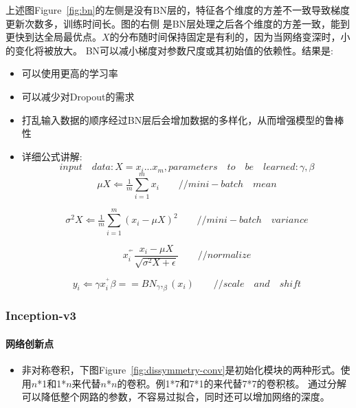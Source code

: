 \documentclass{article}
\begin{document}
\begin{CJK}{UTF8}{gbsn}
上述图Figure~\ref{fig:bn}的左侧是没有BN层的，特征各个维度的方差不一致导致梯度更新次数多，训练时间长。图的右侧
是BN层处理之后各个维度的方差一致，能到更快到达全局最优点。$X$的分布随时间保持固定是有利的，因为当网络变深时，小的变化将被放大。
BN可以减小梯度对参数尺度或其初始值的依赖性。结果是:
\begin{itemize}
\item 可以使用更高的学习率
\item 可以减少对Dropout的需求
\item 打乱输入数据的顺序经过BN层后会增加数据的多样化，从而增强模型的鲁棒性
\item 详细公式讲解:
    \begin{equation}
        input \quad data: X = {x_i...x_m},parameters \quad to \quad be \quad learned: \gamma,\beta 
    \end{equation}
    \begin{equation}
        \mu X \Leftarrow  \tfrac{1}{m} \sum_{i=1}^m x_i  \qquad  //mini-batch \quad mean 
    \end{equation}

    \begin{equation}
        \sigma^2 X \Leftarrow  \tfrac{1}{m} \sum_{i=1}^m (x_i-\mu X)^2  \qquad  //mini-batch \quad variance 
    \end{equation}

    \begin{equation}
        x_i^^ \Leftarrow  \frac{x_i-\mu X}{\sqrt{\sigma^2 X +\epsilon}}   \qquad  //normalize
    \end{equation}

    \begin{equation}
        y_i \Leftarrow  \gamma x_i^^ + \beta  == BN_\gamma,_\beta(x_i)  \qquad  //scale \quad and \quad shift
    \end{equation}
\end{itemize}


\subsubsection{Inception-v3}
\paragraph{网络创新点}
\begin{itemize}
    \item 非对称卷积，下图Figure~\ref{fig:dissymmetry-conv}是初始化模块的两种形式。使用$n$*1和1*$n$来代替$n$*$n$的卷积。例1*7和7*1的来代替7*7的卷积核。
    通过分解可以降低整个网路的参数，不容易过拟合，同时还可以增加网络的深度。


\end{itemize}
\end{CJK}
\end{document}
